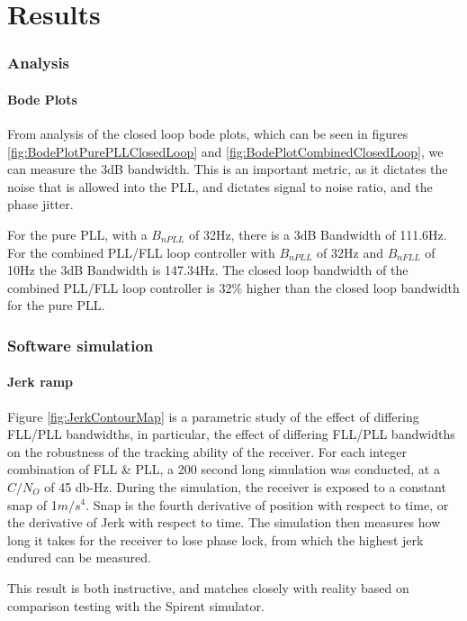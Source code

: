 \chapter{Results}\label{ch:Results}

\subsection{Analysis}


\subsubsection{Bode Plots}

From analysis of the closed loop bode plots, which can be seen in figures \ref{fig:BodePlotPurePLLClosedLoop} and \ref{fig:BodePlotCombinedClosedLoop}, we can measure the 3dB bandwidth. This is an important metric, as it dictates the noise that is allowed into the PLL, and dictates signal to noise ratio, and the phase jitter. 

For the pure PLL, with a $B_{nPLL}$ of 32Hz, there is a 3dB Bandwidth of 111.6Hz. For the combined PLL/FLL loop controller with  $B_{nPLL}$ of 32Hz and  $B_{nFLL}$ of 10Hz the 3dB Bandwidth is 147.34Hz. The closed loop bandwidth of the combined PLL/FLL loop controller is 32\% higher than the closed loop bandwidth for the pure PLL.


\subsection{Software simulation}

\subsubsection{Jerk ramp}

Figure \ref{fig:JerkContourMap} is a parametric study of the effect of differing FLL/PLL bandwidths, in particular, the effect of differing FLL/PLL bandwidths on the robustness of the tracking ability of the receiver. For each integer combination of FLL \& PLL, a 200 second long simulation was conducted, at a $C/N_O$ of 45 db-Hz. During the simulation, the receiver is exposed to a constant snap of 1$m/s^4$. Snap is the fourth derivative of position with respect to time, or the derivative of Jerk with respect to time. The simulation then measures how long it takes for the receiver to lose phase lock, from which the highest jerk endured can be measured. 

This result is both instructive, and matches closely with reality based on comparison testing with the Spirent simulator. 

